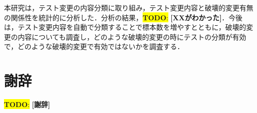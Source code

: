 \documentclass[uplatex,dvipdfmx,a4paper,twocolumn,base=11pt,jbase=11pt,ja=standard]{bxjsarticle}  %
\newcommand{\todo}[1]{\colorbox{yellow}{{\bf TODO}:}{\color{red} {\textbf{[#1]}}}}
\begin{document}
本研究は，テスト変更の内容分類に取り組み，テスト変更内容と破壊的変更有無の関係性を統計的に分析した．分析の結果，\todo{XXがわかった}．今後は，テスト変更内容を自動で分類することで標本数を増やすとともに，破壊的変更の内容についても調査し，どのような破壊的変更の時にテストの分類が有効で，どのような破壊的変更で有効ではないかを調査する．

\section*{謝辞}

\todo{謝辞}

 
\end{document}
